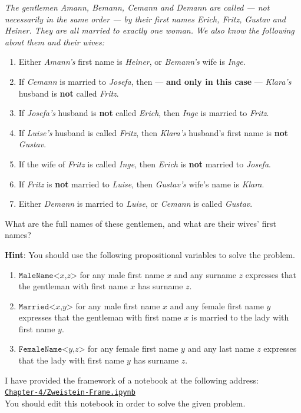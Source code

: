 \begin{minipage}{0.95\linewidth}
  {\sl
    The gentlemen \emph{Amann}, \emph{Bemann}, \emph{Cemann} and \emph{Demann} are called --- not
    necessarily in the same order --- by their 
    first names \emph{Erich}, \emph{Fritz}, \emph{Gustav} and \emph{Heiner}. They are all married to
    exactly one woman. We also know the following about them and their wives: 
    \begin{enumerate}
    \item Either \emph{Amann's} first name is \emph{Heiner}, or \emph{Bemann's} wife is \emph{Inge}.
    \item If \emph{Cemann} is married to \emph{Josefa}, then --- \textbf{and only in this case} ---
          \emph{Klara's} husband is \textbf{not} called \emph{Fritz}.
    \item If \emph{Josefa's} husband is \textbf{not} called \emph{Erich}, then \emph{Inge} is married to
          \emph{Fritz}. 
    \item If \emph{Luise's} husband is called \emph{Fritz}, then \emph{Klara's} husband's first name is
          \textbf{not} \emph{Gustav}. 
    \item If the wife of \emph{Fritz} is called \emph{Inge}, then \emph{Erich} is \textbf{not} married to
          \emph{Josefa}. 
    \item If \emph{Fritz} is \textbf{not} married to \emph{Luise}, then \emph{Gustav's} wife's name is \emph{Klara}.
    \item Either \emph{Demann} is married to \emph{Luise}, or \emph{Cemann} is called \emph{Gustav}.
    \end{enumerate}
    What are the full names of these gentlemen, and what are their wives' first names?}
\end{minipage}
\vspace*{0.3cm}

\noindent
\textbf{Hint}: You should use the following propositional variables to solve the problem.
\begin{enumerate}
\item $\texttt{MaleName<}x\texttt{,}z\texttt{>}$ for any male first name $x$ and any surname $z$ expresses
  that the gentleman with first name $x$ has surname $z$.
\item $\texttt{Married<}x\texttt{,}y\texttt{>}$ for any male first name $x$ and any female first name $y$ expresses
  that the gentleman with first name $x$ is married to the lady with first name $y$.
\item $\texttt{FemaleName<}y\texttt{,}z\texttt{>}$ for any female first name $y$ and any last name $z$ expresses
  that the lady with first name $y$ has surname $z$. \eox
\end{enumerate}
I have provided the framework of a notebook at the following address:
\\[0.2cm]
\hspace*{1.3cm}
\href{https://github.com/karlstroetmann/Logic/blob/master/TypeScript/Chapter-4/Zweistein-Frame.ipynb}{\texttt{Chapter-4/Zweistein-Frame.ipynb}}
\\[0.2cm]
You should edit this notebook in order to solve the given problem. \eox




